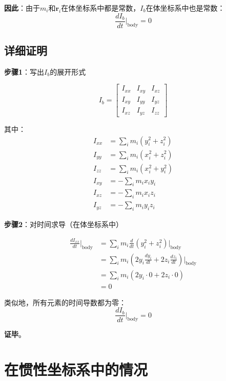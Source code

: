 \documentclass[12pt,a4paper]{article}
\begin{document}
\textbf{因此}：由于$m_i$和$\bm{r}_i$在体坐标系中都是常数，$I_b$在体坐标系中也是常数：
\begin{equation}
\frac{dI_b}{dt}\Big|_{\text{body}} = 0
\end{equation}

\subsection{详细证明}

\textbf{步骤1}：写出$I_b$的展开形式

\begin{equation}
I_b = \begin{bmatrix}
I_{xx} & I_{xy} & I_{xz} \\
I_{xy} & I_{yy} & I_{yz} \\
I_{xz} & I_{yz} & I_{zz}
\end{bmatrix}
\end{equation}

其中：
\begin{align}
I_{xx} &= \sum_i m_i (y_i^2 + z_i^2) \\
I_{yy} &= \sum_i m_i (x_i^2 + z_i^2) \\
I_{zz} &= \sum_i m_i (x_i^2 + y_i^2) \\
I_{xy} &= -\sum_i m_i x_i y_i \\
I_{xz} &= -\sum_i m_i x_i z_i \\
I_{yz} &= -\sum_i m_i y_i z_i
\end{align}

\textbf{步骤2}：对时间求导（在体坐标系中）

\begin{align}
\frac{dI_{xx}}{dt}\Big|_{\text{body}} &= \sum_i m_i \frac{d}{dt}(y_i^2 + z_i^2)\Big|_{\text{body}} \\
&= \sum_i m_i \left(2y_i \frac{dy_i}{dt} + 2z_i \frac{dz_i}{dt}\right)\Big|_{\text{body}} \\
&= \sum_i m_i (2y_i \cdot 0 + 2z_i \cdot 0) \\
&= 0
\end{align}

类似地，所有元素的时间导数都为零：
\begin{equation}
\frac{dI_b}{dt}\Big|_{\text{body}} = 0
\end{equation}

\textbf{证毕}。

\section{在惯性坐标系中的情况}
\end{document}
